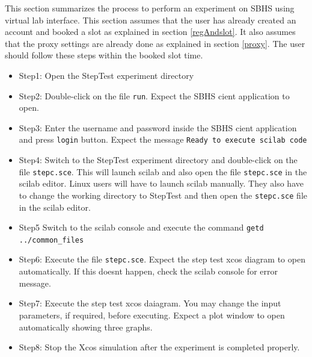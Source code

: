 This section summarizes the process to perform an experiment on SBHS using virtual lab interface. This section assumes that the user has already created an account and booked a slot as explained in section \ref{regAndslot}. It also assumes that the proxy settings are already done as explained in section \ref{proxy}. The user should follow these steps within the booked slot time.
\begin{itemize}
\item Step1: Open the StepTest experiment directory
\item Step2: Double-click on the file {\tt run}. Expect the SBHS cient application to open.
\item Step3: Enter the username and password inside the SBHS cient application and press {\tt login} button. Expect the message {\tt Ready to execute scilab code}
\item Step4: Switch to the StepTest experiment directory and double-click on the file {\tt stepc.sce}. This will launch scilab and also open the file {\tt stepc.sce} in the scilab editor. Linux users will have to launch scilab manually. They also have to change the working directory to StepTest and then open the {\tt stepc.sce} file in the scilab editor.
\item Step5 Switch to the scilab console and execute the command {\tt getd ..\slash common\_files}
\item Step6: Execute the file {\tt stepc.sce}. Expect the step test xcos diagram to open automatically. If this doesnt happen, check the scilab console for error message.
\item Step7: Execute the step test xcos daiagram. You may change the input parameters, if required, before executing. Expect a plot window to open automatically showing three graphs.
\item Step8: Stop the Xcos simulation after the experiment is completed properly. 

\end{itemize}